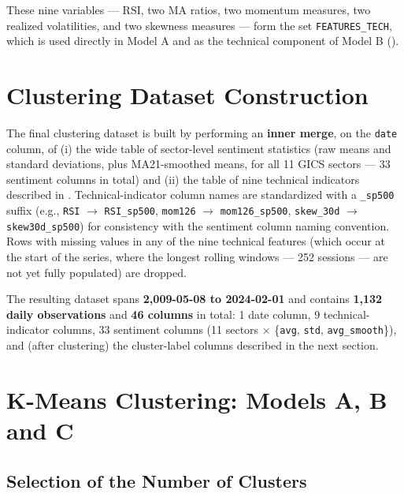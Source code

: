 These nine variables --- $\mathrm{RSI}$, two MA ratios, two momentum
measures, two realized volatilities, and two skewness measures --- form
the set \texttt{FEATURES\_TECH}, which is used directly in Model A and as
the technical component of Model B ().

\section{Clustering Dataset Construction}
\label{sec:meth-dataset}

The final clustering dataset is built by performing an \textbf{inner
merge}, on the \texttt{date} column, of (i) the wide table of sector-level
sentiment statistics (raw means and standard deviations, plus MA21-smoothed
means, for all 11 GICS sectors --- 33 sentiment columns in total) and (ii)
the table of nine technical indicators described in
. Technical-indicator column names are
standardized with a \texttt{\_sp500} suffix (e.g., \texttt{RSI} $\to$
\texttt{RSI\_sp500}, \texttt{mom126} $\to$ \texttt{mom126\_sp500},
\texttt{skew\_30d} $\to$ \texttt{skew30d\_sp500}) for consistency with the
sentiment column naming convention. Rows with missing values in any of
the nine technical features (which occur at the start of the series, where
the longest rolling windows --- 252 sessions --- are not yet fully
populated) are dropped.

The resulting dataset spans \textbf{2{,}009-05-08 to 2024-02-01} and
contains \textbf{1{,}132 daily observations} and \textbf{46 columns} in
total: 1 date column, 9 technical-indicator columns, 33 sentiment columns
(11 sectors $\times$ \{\texttt{avg}, \texttt{std}, \texttt{avg\_smooth}\}),
and (after clustering) the cluster-label columns described in the next
section.

\section{K-Means Clustering: Models A, B and C}
\label{sec:meth-kmeans}

\subsection{Selection of the Number of Clusters}


